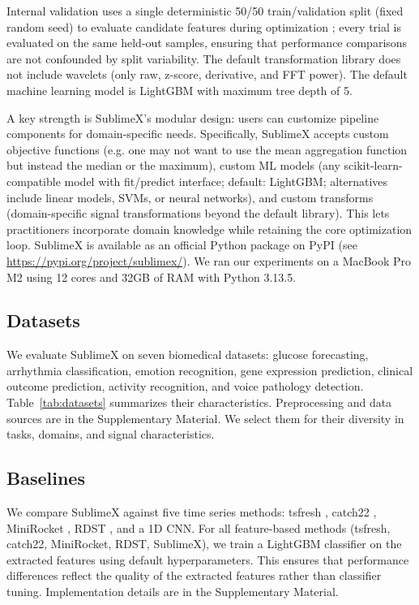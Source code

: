 \documentclass[times, review, 10pt]{elsarticle}
\begin{document}
Internal validation uses a single deterministic 50/50 train/validation split (fixed
random seed) to evaluate candidate features during optimization \cite{bergstra2011tpe};
every trial is evaluated on the same held-out
samples, ensuring that performance comparisons are not confounded by split
variability. The default transformation library does not include wavelets (only raw,
z-score, derivative, and FFT power). The default machine learning model is LightGBM
with maximum tree depth of 5.

A key strength is SublimeX's modular design: users can customize pipeline components for domain-specific needs. 
Specifically, SublimeX accepts custom objective functions (e.g. one may not want to use the mean aggregation function but instead the median or the maximum), custom ML models (any
scikit-learn-compatible model with fit/predict interface; default: LightGBM; alternatives include linear models, SVMs, or neural networks), and custom transforms 
(domain-specific signal transformations beyond the default library). 
This lets practitioners incorporate domain knowledge while retaining the core optimization loop. 
SublimeX is available as an official Python package on PyPI (see \url{https://pypi.org/project/sublimex/}). We ran our experiments on a MacBook Pro M2 using 12 cores and 32GB of RAM with Python 3.13.5.

\subsection{Datasets}
We evaluate SublimeX on seven biomedical datasets: glucose forecasting, arrhythmia classification, emotion recognition, gene expression prediction, clinical outcome prediction, 
activity recognition, and voice pathology detection. Table~\ref{tab:datasets} summarizes their characteristics. Preprocessing and data sources are in the Supplementary Material.
We select them for their diversity in tasks, domains, and signal characteristics.



\subsection{Baselines}
\label{sec:baselines}
We compare SublimeX against five time series methods: tsfresh \cite{christ2018tsfresh}, catch22 \cite{lubba2019catch22}, MiniRocket \cite{dempster2021minirocket}, 
RDST \cite{guillaume2022random}, and a 1D CNN. For all feature-based methods (tsfresh, catch22, MiniRocket, RDST, SublimeX), we train a LightGBM
classifier \cite{ke2017lightgbm} on the extracted features using default hyperparameters. This ensures that performance differences reflect the quality of the extracted features rather than
classifier tuning. Implementation details are in the Supplementary Material.
\end{document}
